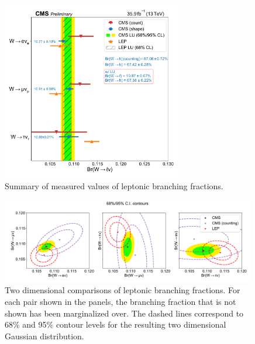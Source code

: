             
\begin{figure}[htb!]
    \begin{center}
    \includegraphics[width=0.7\textwidth]{chapters/Analysis/sectionResult/figures/unblinded_summary_plot.pdf}
    \caption{Summary of measured values of leptonic branching fractions.}
    \label{fig:analysis:result:wbr_result_1D}
    \end{center}
\end{figure}


\begin{figure}[htb!]
    \begin{center}
    \includegraphics[width=0.99\textwidth]{chapters/Analysis/sectionResult/figures/result_contours_2d.pdf}
    \caption{Two dimensional comparisons of leptonic branching
    fractions.  For each pair shown in the panels, the branching
    fraction that is not shown has been marginalized over.  The dashed
    lines correspond to 68\% and 95\% contour levels for the resulting two
    dimensional Gaussian distribution.}
    \label{fig:analysis:result:contours_2D}
    \end{center}
\end{figure}


